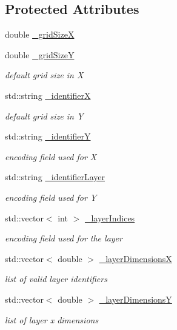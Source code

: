 \subsection*{Protected Attributes}
\begin{DoxyCompactItemize}
\item 
double \hyperlink{class_d_d4hep_1_1_d_d_segmentation_1_1_tiled_layer_segmentation_a8e60c82ed47b0b33c4c7918baea38296}{\+\_\+grid\+SizeX}
\item 
double \hyperlink{class_d_d4hep_1_1_d_d_segmentation_1_1_tiled_layer_segmentation_a71e5e4524b30002b118f464626558c39}{\+\_\+grid\+SizeY}
\begin{DoxyCompactList}\small\item\em default grid size in X \end{DoxyCompactList}\item 
std\+::string \hyperlink{class_d_d4hep_1_1_d_d_segmentation_1_1_tiled_layer_segmentation_ac79fffb5bdd56134ef2824ebb10ac1de}{\+\_\+identifierX}
\begin{DoxyCompactList}\small\item\em default grid size in Y \end{DoxyCompactList}\item 
std\+::string \hyperlink{class_d_d4hep_1_1_d_d_segmentation_1_1_tiled_layer_segmentation_af157c59a13254572f336a345463e993d}{\+\_\+identifierY}
\begin{DoxyCompactList}\small\item\em encoding field used for X \end{DoxyCompactList}\item 
std\+::string \hyperlink{class_d_d4hep_1_1_d_d_segmentation_1_1_tiled_layer_segmentation_a83e95ac7e65a186e5b15c4b72e57e1c6}{\+\_\+identifier\+Layer}
\begin{DoxyCompactList}\small\item\em encoding field used for Y \end{DoxyCompactList}\item 
std\+::vector$<$ int $>$ \hyperlink{class_d_d4hep_1_1_d_d_segmentation_1_1_tiled_layer_segmentation_a1988abb223b228480310aaf061d9210e}{\+\_\+layer\+Indices}
\begin{DoxyCompactList}\small\item\em encoding field used for the layer \end{DoxyCompactList}\item 
std\+::vector$<$ double $>$ \hyperlink{class_d_d4hep_1_1_d_d_segmentation_1_1_tiled_layer_segmentation_afd897bc752982287d6184099d6badede}{\+\_\+layer\+DimensionsX}
\begin{DoxyCompactList}\small\item\em list of valid layer identifiers \end{DoxyCompactList}\item 
std\+::vector$<$ double $>$ \hyperlink{class_d_d4hep_1_1_d_d_segmentation_1_1_tiled_layer_segmentation_a48d863dc32788c26ddb770d88bb89f96}{\+\_\+layer\+DimensionsY}
\begin{DoxyCompactList}\small\item\em list of layer x dimensions \end{DoxyCompactList}\end{DoxyCompactItemize}
